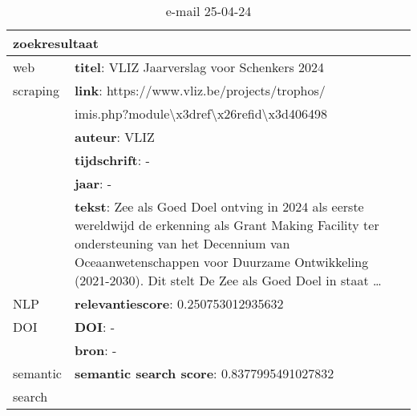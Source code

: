 \begin{table}[h!]
    \caption{e-mail 25-04-24}
    \centering
    \begin{tabularx}{\textwidth}{|p{4cm}|X|} 
        \hline
        \multicolumn{2}{|X|}{\textbf{zoekresultaat}} \\
        \hline
        web &\textbf{titel}: VLIZ Jaarverslag voor Schenkers 2024\\
        scraping&\textbf{link}: https://www.vliz.be/projects/trophos/\\&imis.php?module\textbackslash x3dref\textbackslash x26refid\textbackslash x3d406498\\
        &\textbf{auteur}: VLIZ\\
        &\textbf{tijdschrift}: -\\
        &\textbf{jaar}: -\\
        &\textbf{tekst}: Zee als Goed Doel ontving in 2024 als eerste wereldwijd de erkenning als Grant Making Facility ter ondersteuning van het Decennium van Oceaanwetenschappen voor Duurzame Ontwikkeling (2021-2030). Dit stelt De Zee als Goed Doel in staat …\\
        \hline
        NLP&\textbf{relevantiescore}: 0.250753012935632\\
        \hline
        DOI&\textbf{DOI}: -\\
        &\textbf{bron}: -\\
        \hline
        semantic&\textbf{semantic search score}: 0.8377995491027832\\
        search&\\
        \hline
    \end{tabularx}
    \label{table:email20250424}
\end{table}
